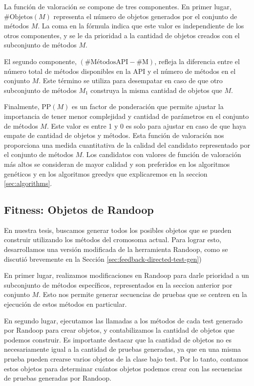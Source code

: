 La función de valoración se compone de tres componentes. En primer lugar, $\text{{\#Objetos}}(M)$ representa el número de objetos generados por el conjunto de métodos $M$. La coma en la fórmula indica que este valor es independiente de los otros componentes, y se le da prioridad a la cantidad de objetos creados con el subconjunto de métodos $M$.

El segundo componente, $(\text{{\#MétodosAPI}} - \text{{\#M}})$, refleja la diferencia entre el número total de métodos disponibles en la API y el número de métodos en el conjunto $M$. Este término se utiliza para desempatar en caso de que otro subconjunto de métodos $M_1$ construya la misma cantidad de objetos que $M$.

Finalmente, $\text{{PP}}(M)$ es un factor de ponderación que permite ajustar la importancia de tener menor complejidad y cantidad de parámetros en el conjunto de métodos $M$. Este valor es entre 1 y 0 es solo para ajustar en caso de que haya empate de cantidad de objetos y métodos.
Esta función de valoración nos proporciona una medida cuantitativa de la calidad del candidato representado por el conjunto de métodos $M$. Los candidatos con valores de función de valoración más altos se consideran de mayor calidad y son preferidos en los algoritmos genéticos y en los algoritmos greedys que explicaremos en la seccion \ref{sec:algorithms}.


\subsection{Fitness: Objetos de Randoop}

En nuestra tesis, buscamos generar todos los posibles objetos que se pueden construir utilizando los métodos del cromosoma actual. Para lograr esto, desarrollamos una versión modificada de la herramienta Randoop, como se discutió brevemente en la Sección \ref{sec:feedback-directed-test-gen})

En primer lugar, realizamos modificaciones en Randoop para darle prioridad a un subconjunto de métodos específicos, representados en la seccion anterior por conjunto $M$. Esto nos permite generar secuencias de pruebas que se centren en la ejecución de estos métodos en particular.

En segundo lugar, ejecutamos las llamadas a los métodos de cada test generado por Randoop para crear objetos, y contabilizamos la cantidad de objetos que podemos construir. Es importante destacar que la cantidad de objetos no es necesariamente igual a la cantidad de pruebas generadas, ya que en una misma prueba pueden crearse varios objetos de la clase bajo test. Por lo tanto, contamos estos objetos para determinar cuántos objetos podemos crear con las secuencias de pruebas generadas por Randoop.


